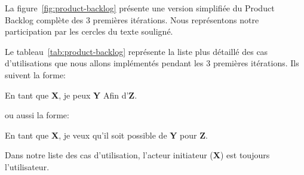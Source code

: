 La figure~\ref{fig:product-backlog} présente une version simplifiée du Product
Backlog complète des 3 premières itérations. Nous représentons notre
participation par les cercles du texte souligné.



Le tableau~\ref{tab:product-backlog} représente la liste plus détaillé des cas
d'utilisations que nous allons implémentés pendant les 3 premières itérations.
Ils suivent la forme:

\begin{displayquote}
    En tant que \textbf{X}, je peux \textbf{Y} Afin d'\textbf{Z}.
\end{displayquote}

ou aussi la forme:

\begin{displayquote}
    En tant que \textbf{X}, je veux qu'il soit possible de \textbf{Y} pour
    \textbf{Z}.
\end{displayquote}

Dans notre liste des cas d'utilisation, l'acteur initiateur (\textbf{X}) est
toujours l'utilisateur.


